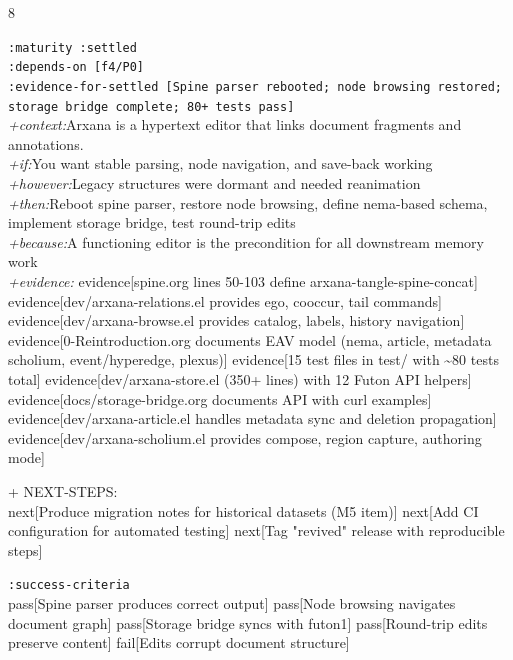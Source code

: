 \documentclass[landscape]{article}
\newcommand{\flexitag}[1]{\textcolor[gray]{0.35}{\textit{#1}}}
\newenvironment{devmapsettled}{%
  \def\FrameCommand{\colorbox{devmapsettledbg}}%
  \setlength{\fboxsep}{2pt}%
  \MakeFramed{\advance\hsize-\width \FrameRestore}%
}{\endMakeFramed}
\begin{document}
\begin{paracol}{8}
\begin{devmapsettled}
  \texttt{:\allowbreak{}maturity :\allowbreak{}settled}\\
  \texttt{:\allowbreak{}depends-\allowbreak{}on [f4/\allowbreak{}P0]}\\
  \texttt{:\allowbreak{}evidence-\allowbreak{}for-\allowbreak{}settled [Spine parser rebooted;\allowbreak{} node browsing restored;\allowbreak{} storage bridge complete;\allowbreak{} 80+\allowbreak{} tests pass]}\\
  \flexitag{+context:}Arxana is a hypertext editor that links document fragments and annotations.\\
  \flexitag{+if:}You want stable parsing, node navigation, and save-back working\\
  \flexitag{+however:}Legacy structures were dormant and needed reanimation\\
  \flexitag{+then:}Reboot spine parser, restore node browsing, define nema-based schema, implement storage bridge, test round-trip edits\\
  \flexitag{+because:}A functioning editor is the precondition for all downstream memory work\\
  \flexitag{+evidence:} evidence[spine.org lines 50-103 define arxana-tangle-spine-concat] evidence[dev/arxana-relations.el provides ego, cooccur, tail commands] evidence[dev/arxana-browse.el provides catalog, labels, history navigation] evidence[0-Reintroduction.org documents EAV model (nema, article, metadata scholium, event/hyperedge, plexus)] evidence[15 test files in test/ with \textasciitilde{}80 tests total] evidence[dev/arxana-store.el (350+ lines) with 12 Futon API helpers] evidence[docs/storage-bridge.org documents API with curl examples] evidence[dev/arxana-article.el handles metadata sync and deletion propagation] evidence[dev/arxana-scholium.el provides compose, region capture, authoring mode]\\
\par
  + NEXT-STEPS:\\
    next[Produce migration notes for historical datasets (M5 item)] next[Add CI configuration for automated testing] next[Tag "revived" release with reproducible steps]\\
\par
  \texttt{:\allowbreak{}success-\allowbreak{}criteria}\\
    pass[Spine parser produces correct output] pass[Node browsing navigates document graph] pass[Storage bridge syncs with futon1] pass[Round-trip edits preserve content] fail[Edits corrupt document structure]\\

\end{devmapsettled}
\end{paracol}
\end{document}
